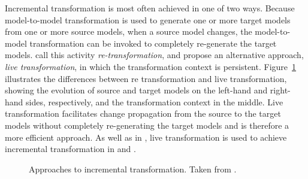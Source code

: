 Incremental transformation is most often achieved in one of two ways. Because model-to-model transformation is used to generate one or more target models from one or more source models, when a source model changes, the model-to-model transformation can be invoked to completely re-generate the target models. \cite{hearnden06incremental} call this activity \emph{re-transformation}, and propose an alternative approach, \emph{live transformation}, in which the transformation context is persistent. Figure~\ref{fig:incremental_transformation_types} illustrates the differences between re transformation and live transformation, showing the evolution of source and target models on the left-hand and right-hand sides, respectively, and the transformation context in the middle.  Live transformation facilitates change propagation from the source to the target models without completely re-generating the target models and is therefore a more efficient approach. As well as in \cite{hearnden06incremental}, live transformation is used to achieve incremental transformation in \cite{rath08live} and \cite{tratt08change}.

\begin{figure}[htbp]
	\centering
	\caption{Approaches to incremental transformation. Taken from \cite{hearnden06incremental}.}
\label{fig:incremental_transformation_types}
\end{figure}

